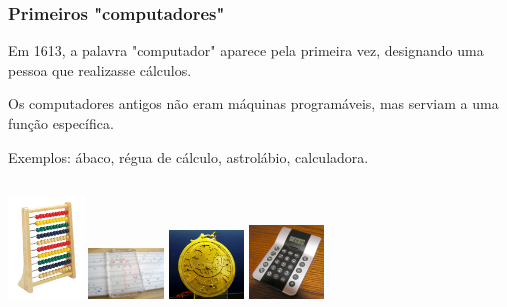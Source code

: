 \documentclass[hyperref={pdfpagelabels=false}]{beamer}
\begin{document}
\begin{frame}
   \frametitle{Primeiros "computadores"}
   Em 1613, a palavra "computador" aparece pela primeira vez, designando uma pessoa que realizasse cálculos.
   
   Os computadores antigos não eram máquinas programáveis, mas serviam a uma função específica. 
   
   Exemplos: ábaco, régua de cálculo, astrolábio, calculadora.
   \begin{columns}
      \column{2cm}
      \includegraphics[width=2cm]{img/abaco.jpg}
      \column{2cm}
      \includegraphics[width=2cm]{img/regua_de_calculo.jpg}
      \column{2cm}
      \includegraphics[width=2cm]{img/astrolabio.jpg}
      \column{2cm}
      \includegraphics[width=2cm]{img/calculadora.jpg}
   \end{columns}
\end{frame}
%
\end{document}
